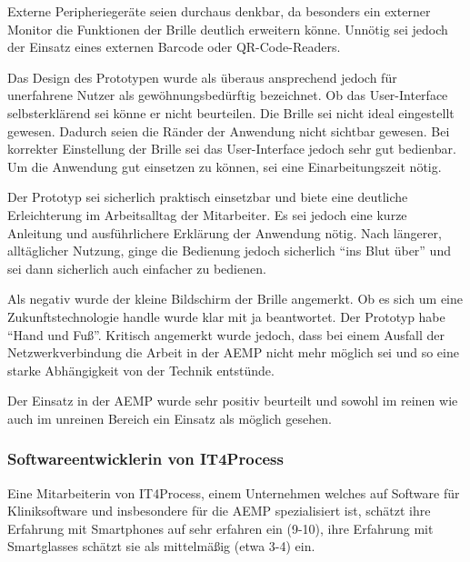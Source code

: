 Externe Peripheriegeräte seien durchaus denkbar, da besonders ein externer Monitor die Funktionen der Brille deutlich erweitern könne. Unnötig sei jedoch der Einsatz eines externen Barcode oder QR-Code-Readers.

Das Design des Prototypen wurde als überaus ansprechend jedoch für unerfahrene Nutzer als gewöhnungsbedürftig bezeichnet. Ob das User-Interface selbsterklärend sei könne er nicht beurteilen. Die Brille sei nicht ideal eingestellt gewesen. Dadurch seien die Ränder der Anwendung nicht sichtbar gewesen. Bei korrekter Einstellung der Brille sei das User-Interface jedoch sehr gut bedienbar. Um die Anwendung gut einsetzen zu können, sei eine Einarbeitungszeit nötig. 

Der Prototyp sei sicherlich praktisch einsetzbar und biete eine deutliche Erleichterung im Arbeitsalltag der Mitarbeiter. Es sei jedoch eine kurze Anleitung und ausführlichere Erklärung der Anwendung nötig. Nach längerer, alltäglicher Nutzung, ginge die Bedienung jedoch sicherlich \enquote{ins Blut über} und sei dann sicherlich auch einfacher zu bedienen. 

Als negativ wurde der kleine Bildschirm der Brille angemerkt. Ob es sich um eine Zukunftstechnologie handle wurde klar mit ja beantwortet. Der Prototyp habe \enquote{Hand und Fuß}. Kritisch angemerkt wurde jedoch, dass bei einem Ausfall der Netzwerkverbindung die Arbeit in der AEMP nicht mehr möglich sei und so eine starke Abhängigkeit von der Technik entstünde.

Der Einsatz in der AEMP wurde sehr positiv beurteilt und sowohl im reinen wie auch im unreinen Bereich ein Einsatz als möglich gesehen.
%
%
\subsubsection{Softwareentwicklerin von IT4Process}
%
Eine Mitarbeiterin von IT4Process, einem Unternehmen welches auf Software für Kliniksoftware und insbesondere für die AEMP spezialisiert ist, schätzt ihre Erfahrung mit Smartphones auf sehr erfahren ein (9-10), ihre Erfahrung mit Smartglasses schätzt sie als mittelmäßig (etwa 3-4) ein. 

